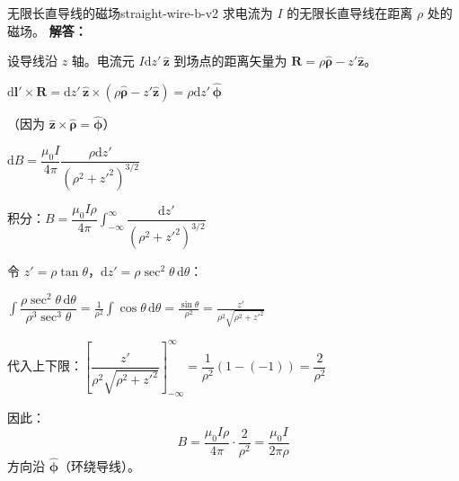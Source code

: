 \documentclass[11pt,a4paper,openany,oneside]{book}
\newcommand{\diff}{\mathrm{d}}
\newcommand{\muz}{\mu_0}
\newcommand{\vect}[1]{\bm{#1}}
\newcommand{\unitvec}[1]{\hat{\vect{#1}}}
\newcommand{\difficulty}[1]{\marginnote{\textcolor{red}{\textbf{[#1]}}}}
\begin{document}
\begin{example}{无限长直导线的磁场}{straight-wire-b-v2}
\difficulty{基础}
求电流为 $I$ 的无限长直导线在距离 $\rho$ 处的磁场。
\tcblower
\textbf{解答：}

设导线沿 $z$ 轴。电流元 $I\diff z'\,\unitvec{z}$ 到场点的距离矢量为 $\vect{R} = \rho\unitvec{\rho} - z'\unitvec{z}$。

$\diff\vect{l}' \times \vect{R} = \diff z'\,\unitvec{z} \times (\rho\unitvec{\rho} - z'\unitvec{z}) = \rho\diff z'\,\unitvec{\phi}$

（因为 $\unitvec{z} \times \unitvec{\rho} = \unitvec{\phi}$）

$\diff B = \dfrac{\muz I}{4\pi} \dfrac{\rho\diff z'}{(\rho^2 + z'^2)^{3/2}}$

积分：$B = \dfrac{\muz I\rho}{4\pi} \int_{-\infty}^{\infty} \dfrac{\diff z'}{(\rho^2+z'^2)^{3/2}}$

令 $z' = \rho\tan\theta$，$\diff z' = \rho\sec^2\theta\,\diff\theta$：

$\displaystyle\int \dfrac{\rho\sec^2\theta\,\diff\theta}{\rho^3\sec^3\theta} = \frac{1}{\rho^2}\int\cos\theta\,\diff\theta = \frac{\sin\theta}{\rho^2} = \frac{z'}{\rho^2\sqrt{\rho^2+z'^2}}$

代入上下限：$\left[\dfrac{z'}{\rho^2\sqrt{\rho^2+z'^2}}\right]_{-\infty}^{\infty} = \dfrac{1}{\rho^2}(1 - (-1)) = \dfrac{2}{\rho^2}$

因此：
\[
B = \frac{\muz I\rho}{4\pi} \cdot \frac{2}{\rho^2} = \frac{\muz I}{2\pi\rho}
\]
方向沿 $\unitvec{\phi}$（环绕导线）。
\end{example}
\end{document}
